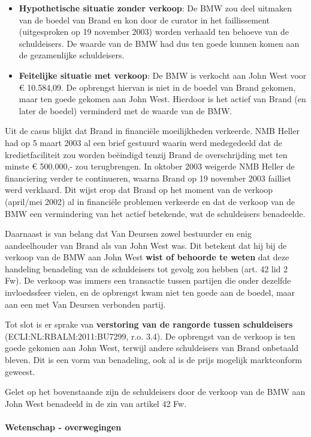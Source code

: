 \documentclass[
  dutch,
  a4paper,
]{article}
\providecommand{\tightlist}{%
  \setlength{\itemsep}{0pt}\setlength{\parskip}{0pt}}
\begin{document}
\begin{itemize}
\tightlist
\item
  \textbf{Hypothetische situatie zonder verkoop}: De BMW zou deel uitmaken van de boedel van Brand en kon door de curator in het faillissement (uitgesproken op 19 november 2003) worden verhaald ten behoeve van de schuldeisers. De waarde van de BMW had dus ten goede kunnen komen aan de gezamenlijke schuldeisers.
\item
  \textbf{Feitelijke situatie met verkoop}: De BMW is verkocht aan John West voor € 10.584,09. De opbrengst hiervan is niet in de boedel van Brand gekomen, maar ten goede gekomen aan John West. Hierdoor is het actief van Brand (en later de boedel) verminderd met de waarde van de BMW.
\end{itemize}

Uit de casus blijkt dat Brand in financiële moeilijkheden verkeerde. NMB Heller had op 5 maart 2003 al een brief gestuurd waarin werd medegedeeld dat de kredietfaciliteit zou worden beëindigd tenzij Brand de overschrijding met ten minste € 500.000,- zou terugbrengen. In oktober 2003 weigerde NMB Heller de financiering verder te continueren, waarna Brand op 19 november 2003 failliet werd verklaard. Dit wijst erop dat Brand op het moment van de verkoop (april/mei 2002) al in financiële problemen verkeerde en dat de verkoop van de BMW een vermindering van het actief betekende, wat de schuldeisers benadeelde.

Daarnaast is van belang dat Van Deursen zowel bestuurder en enig aandeelhouder van Brand als van John West was. Dit betekent dat hij bij de verkoop van de BMW aan John West \textbf{wist of behoorde te weten} dat deze handeling benadeling van de schuldeisers tot gevolg zou hebben (art. 42 lid 2 Fw). De verkoop was immers een transactie tussen partijen die onder dezelfde invloedssfeer vielen, en de opbrengst kwam niet ten goede aan de boedel, maar aan een met Van Deursen verbonden partij.

Tot slot is er sprake van \textbf{verstoring van de rangorde tussen schuldeisers} (ECLI:NL:RBALM:2011:BU7299, r.o. 3.4). De opbrengst van de verkoop is ten goede gekomen aan John West, terwijl andere schuldeisers van Brand onbetaald bleven. Dit is een vorm van benadeling, ook al is de prijs mogelijk marktconform geweest.

Gelet op het bovenstaande zijn de schuldeisers door de verkoop van de BMW aan John West benadeeld in de zin van artikel 42 Fw.

\paragraph{Wetenschap - overwegingen}\label{wetenschap---overwegingen-57}
\end{document}
